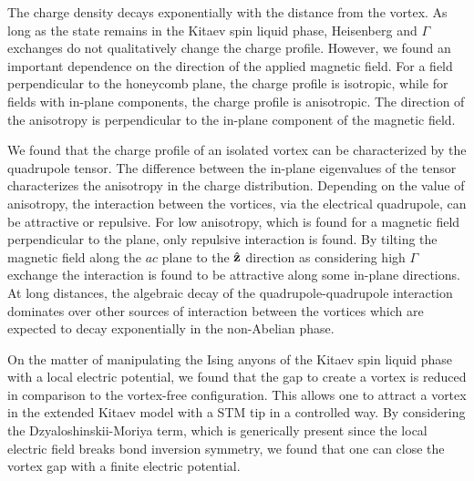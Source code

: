 The charge density decays exponentially with the distance from the vortex. As long as the state remains in the Kitaev spin liquid phase, Heisenberg and $\Gamma$ exchanges do not qualitatively change the charge profile. However, we found an important dependence on the direction of the applied magnetic field. For a field perpendicular to the honeycomb plane, the charge profile is isotropic, while for fields with in-plane components, the charge profile is anisotropic. The direction of the anisotropy is perpendicular to the in-plane component of the magnetic field.


We found that the charge profile of an isolated vortex can be characterized by the quadrupole tensor. %
The difference between the in-plane eigenvalues of the tensor characterizes the anisotropy in the charge distribution.
Depending on the value of anisotropy, the interaction between the vortices, via the electrical quadrupole, can be attractive or repulsive. For low anisotropy, which is found for a magnetic field perpendicular to the plane, only repulsive interaction is found. By tilting the magnetic field along the $ac$ plane to the $\hat{\mathbf z}$ direction as considering high $\Gamma$ exchange the interaction is found to be attractive along some in-plane directions.
At long distances, the algebraic decay of the quadrupole-quadrupole interaction dominates over other sources of interaction between the vortices which are expected to decay exponentially in the non-Abelian phase.

On the matter of manipulating the Ising anyons of the Kitaev spin liquid phase with a local electric potential, we found that the gap to create a vortex is reduced in comparison to the vortex-free configuration. This allows one to attract a vortex in the extended Kitaev model with a STM tip in a controlled way.
By considering the Dzyaloshinskii-Moriya term, which is generically present since the local electric field breaks bond inversion symmetry, we found that one can close the vortex gap with a finite electric potential.


